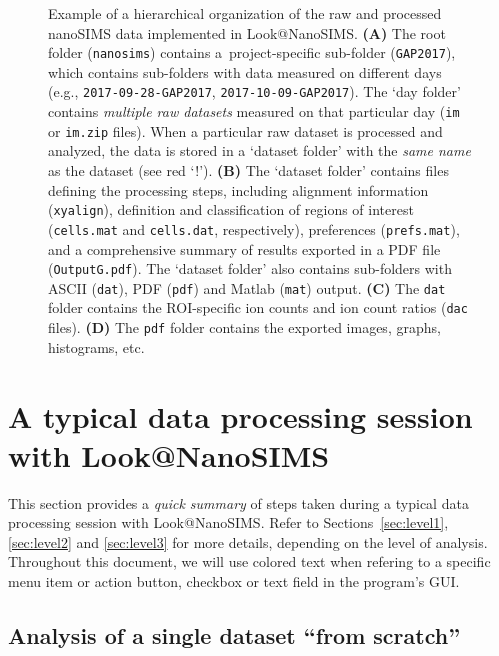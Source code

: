 \documentclass[a4paper, 11pt]{article}
\newcommand{\ttt}[1]{\texttt{#1}}
\newcommand{\lans}[1]{{\color{magenta}#1}}
\newcommand{\lanscb}[1]{{\color{darkgreen}#1}}
\newcommand{\lanstf}[1]{{\color{cyan}#1}}
\begin{document}
\begin{figure} [t!]
    \captionsetup{labelformat=adja-page}
    \ContinuedFloat
    \caption[Figure]{%
    Example of a hierarchical organization of the raw and processed nanoSIMS data implemented in Look@NanoSIMS. %
    \textbf{(A)} The root folder (\ttt{nanosims}) contains a~project-specific sub-folder (\ttt{GAP2017}), which contains sub-folders with data measured on different days (e.g., \ttt{2017-09-28-GAP2017}, \ttt{2017-10-09-GAP2017}). %
    The `day folder' contains \emph{multiple raw datasets} measured on that particular day (\ttt{im} or \ttt{im.zip} files). %
    When a particular raw dataset is processed and analyzed, the data is stored in a `dataset folder' with the \emph{same name} as the dataset (see red `!'). %
    \textbf{(B)} The `dataset folder' contains files defining the processing steps, including alignment information (\ttt{xyalign}), definition and classification of regions of interest (\ttt{cells.mat} and \ttt{cells.dat}, respectively), preferences (\ttt{prefs.mat}), and a comprehensive summary of results exported in a PDF file (\ttt{OutputG.pdf}). %
    The `dataset folder' also contains sub-folders with ASCII (\ttt{dat}), PDF (\ttt{pdf}) and Matlab (\ttt{mat}) output. %
    \textbf{(C)} The \ttt{dat} folder contains the ROI-specific ion counts and ion count ratios (\ttt{dac} files). %
    \textbf{(D)} The \ttt{pdf} folder contains the exported images, graphs, histograms, etc. }
    \label{fig2:data_organization}
\end{figure}


\clearpage

\section{A typical data processing session with Look@NanoSIMS}

This section provides a \emph{quick summary} of steps taken during a typical data processing session with Look@NanoSIMS. Refer to Sections~\ref{sec:level1}, \ref{sec:level2} and \ref{sec:level3} for more details, depending on the level of analysis. Throughout this document, we will use colored text when refering to a specific \lans{menu item or action button}, \lanscb{checkbox} or \lanstf{text field} in the program's GUI.


\subsection{Analysis of a single dataset ``from scratch''}
\label{sec:analysis_from_scratch}
\end{document}

